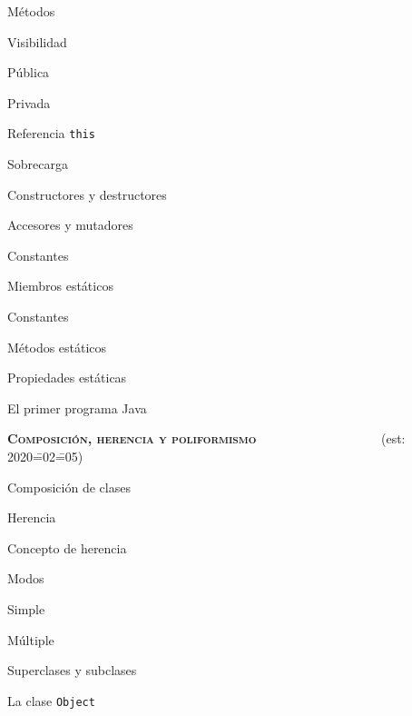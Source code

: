 \begin{longenum}
\begin{longenum}
\begin{longenum}
        \end{longenum}
        \item Métodos
        \begin{longenum}
            \item Visibilidad
            \begin{longenum}
                \item Pública
                \item Privada
            \end{longenum}
            \item Referencia \texttt{this}
            \item Sobrecarga
            \item Constructores y destructores
            \item Accesores y mutadores
        \end{longenum}
        \item Constantes
        \item Miembros estáticos
        \begin{longenum}
            \item Constantes
            \item Métodos estáticos
            \item Propiedades estáticas
        \end{longenum}
        \item El primer programa Java
    \end{longenum}
    \item \textbf{\textsc{Composición, herencia y poliformismo}} \ \ \ \ \ \ \ \ \ \ \ \ \ \ \ \ \ \ \ (est: 2020\==02\==05)
    \begin{longenum}
        \item Composición de clases
        \item Herencia
        \begin{longenum}
            \item Concepto de herencia
            \item Modos
            \begin{longenum}
                \item Simple
                \item Múltiple
            \end{longenum}
            \item Superclases y subclases
            \item La clase \texttt{Object}

\end{longenum}
\end{longenum}
\end{longenum}
